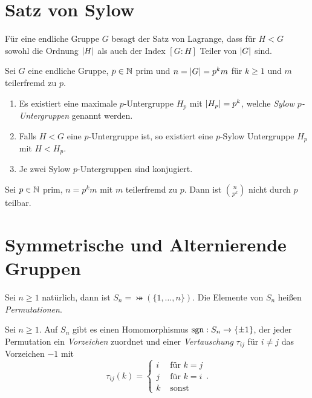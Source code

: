 \section{Satz von Sylow}
Für eine endliche Gruppe $G$ besagt der Satz von Lagrange, dass für $H < G$ sowohl die Ordnung $\abs{H}$ als auch der Index $[G:H]$ Teiler von  $\abs{G}$ sind.

\begin{theorem}[Sylow]
	Sei $G$ eine endliche Gruppe, $p \in \mathbb{N}$ prim und $n = \abs{G} = p^{k} m$ für $k \geq 1$ und $m$ teilerfremd zu $p$.
	\begin{enumerate}[1)]
		\item Es existiert eine maximale $p$-Untergruppe $H_{p}$ mit $\abs{H_{p}} = p^{k}$, welche \emph{Sylow $p$-Untergruppen} genannt werden.
		\item Falls $H < G$ eine $p$-Untergruppe ist, so existiert eine $p$-Sylow Untergruppe $H_{p}$ mit $H < H_{p}$.
		\item Je zwei Sylow $p$-Untergruppen sind konjugiert.
	\end{enumerate}
\end{theorem}

\begin{lemma}
	Sei $p \in \mathbb{N}$ prim, $n = p^{k}m$ mit $m$ teilerfremd zu $p$.
	Dann ist $\binom{n}{p^{k}}$ nicht durch $p$ teilbar.
\end{lemma}





\section{Symmetrische und Alternierende Gruppen}

\begin{definition}
	Sei $n \geq 1$ natürlich, dann ist $S_{n} = \bij(\{1,\ldots,n\})$.
	Die Elemente von $S_{n}$ heißen \emph{Permutationen}.
\end{definition}

\begin{theorem}
	Sei $n \geq 1$. Auf $S_{n}$ gibt es einen Homomorphismus $\operatorname{sgn}: S_{n} \to \{\pm 1\}$, der jeder Permutation ein \emph{Vorzeichen} zuordnet
	und einer \emph{Vertauschung} $\tau_{ij}$ für $i \neq j$ das Vorzeichen $-1$ mit
	\[
		\tau_{ij}(k) = \begin{cases}
			i &\text{ für } k = j\\
			j &\text{ für } k = i\\
			k &\text{ sonst}
		\end{cases}
	.\] 
\end{theorem}

